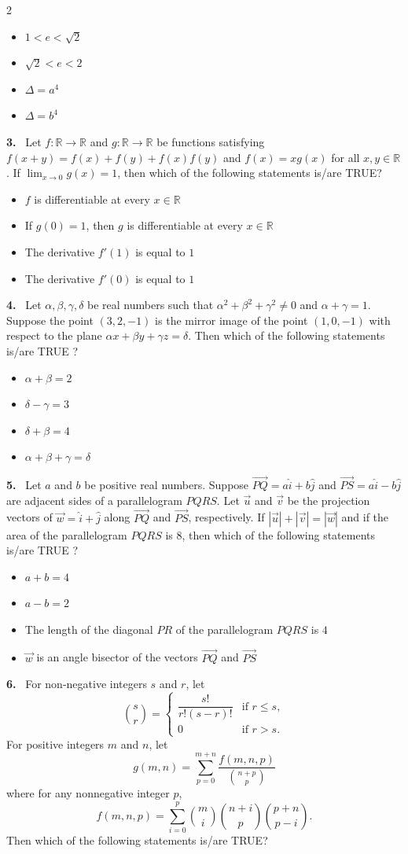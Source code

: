 \documentclass[10pt]{extarticle}
\newcommand{\qn}[1]{\par\smallskip\noindent\textbf{#1.}~}
\newenvironment{qoptions}{\begin{itemize}[leftmargin=1.8em,itemsep=1pt,topsep=2pt,label={}]}{\end{itemize}}
\newcommand{\opt}[2]{\item[(#1)] #2}
\begin{document}
\begin{multicols}{2}
\begin{qoptions}
\opt{A}{$1<e<\sqrt2$}
\opt{B}{$\sqrt2<e<2$}
\opt{C}{$\Delta=a^4$}
\opt{D}{$\Delta=b^4$}
\end{qoptions}
\qn{3} Let $f:\mathbb R\to\mathbb R$ and $g:\mathbb R\to\mathbb R$ be functions satisfying $f(x+y)=f(x)+f(y)+f(x)f(y)$ and $f(x)=xg(x)$ for all $x,y\in\mathbb R$. If $\displaystyle\lim_{x\to0}g(x)=1$, then which of the following statements is/are TRUE?
\begin{qoptions}
\opt{A}{$f$ is differentiable at every $x\in\mathbb R$}
\opt{B}{If $g(0)=1$, then $g$ is differentiable at every $x\in\mathbb R$}
\opt{C}{The derivative $f'(1)$ is equal to $1$}
\opt{D}{The derivative $f'(0)$ is equal to $1$}
\end{qoptions}
\qn{4} Let $\alpha,\beta,\gamma,\delta$ be real numbers such that $\alpha^2+\beta^2+\gamma^2\ne0$ and $\alpha+\gamma=1$. Suppose the point $(3,2,-1)$ is the mirror image of the point $(1,0,-1)$ with respect to the plane $\alpha x+\beta y+\gamma z=\delta$. Then which of the following statements is/are TRUE ?
\begin{qoptions}
\opt{A}{$\alpha+\beta=2$}
\opt{B}{$\delta-\gamma=3$}
\opt{C}{$\delta+\beta=4$}
\opt{D}{$\alpha+\beta+\gamma=\delta$}
\end{qoptions}
\qn{5} Let $a$ and $b$ be positive real numbers. Suppose $\overrightarrow{PQ}=a\hat i+b\hat j$ and $\overrightarrow{PS}=a\hat i-b\hat j$ are adjacent sides of a parallelogram $PQRS$. Let $\vec u$ and $\vec v$ be the projection vectors of $\vec w=\hat i+\hat j$ along $\overrightarrow{PQ}$ and $\overrightarrow{PS}$, respectively. If $|\vec u|+|\vec v|=|\vec w|$ and if the area of the parallelogram $PQRS$ is $8$, then which of the following statements is/are TRUE ?
\begin{qoptions}
\opt{A}{$a+b=4$}
\opt{B}{$a-b=2$}
\opt{C}{The length of the diagonal $PR$ of the parallelogram $PQRS$ is $4$}
\opt{D}{$\vec w$ is an angle bisector of the vectors $\overrightarrow{PQ}$ and $\overrightarrow{PS}$}
\end{qoptions}
\qn{6} For non-negative integers $s$ and $r$, let
\[\binom sr=\begin{cases}\dfrac{s!}{r!(s-r)!}&\text{if }r\le s,\\[1ex] 0&\text{if }r>s.\end{cases}\]
For positive integers $m$ and $n$, let
\[g(m,n)=\sum_{p=0}^{m+n}\frac{f(m,n,p)}{\binom{n+p}{p}}\]
where for any nonnegative integer $p$,
\[f(m,n,p)=\sum_{i=0}^{p}\binom mi\binom{n+i}{p}\binom{p+n}{p-i}.\]
Then which of the following statements is/are TRUE?

\end{multicols}
\end{document}
